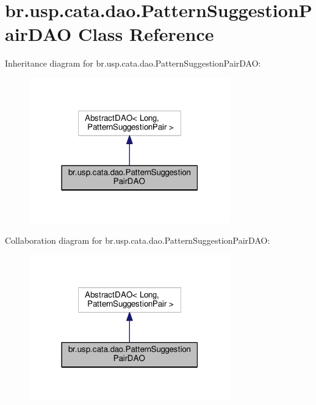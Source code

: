 \hypertarget{classbr_1_1usp_1_1cata_1_1dao_1_1_pattern_suggestion_pair_d_a_o}{\section{br.\+usp.\+cata.\+dao.\+Pattern\+Suggestion\+Pair\+D\+A\+O Class Reference}
\label{classbr_1_1usp_1_1cata_1_1dao_1_1_pattern_suggestion_pair_d_a_o}
}


Inheritance diagram for br.\+usp.\+cata.\+dao.\+Pattern\+Suggestion\+Pair\+D\+A\+O\+:\nopagebreak
\begin{figure}[H]
\begin{center}
\leavevmode
\includegraphics[width=247pt]{classbr_1_1usp_1_1cata_1_1dao_1_1_pattern_suggestion_pair_d_a_o__inherit__graph}
\end{center}
\end{figure}


Collaboration diagram for br.\+usp.\+cata.\+dao.\+Pattern\+Suggestion\+Pair\+D\+A\+O\+:\nopagebreak
\begin{figure}[H]
\begin{center}
\leavevmode
\includegraphics[width=247pt]{classbr_1_1usp_1_1cata_1_1dao_1_1_pattern_suggestion_pair_d_a_o__coll__graph}
\end{center}
\end{figure}
